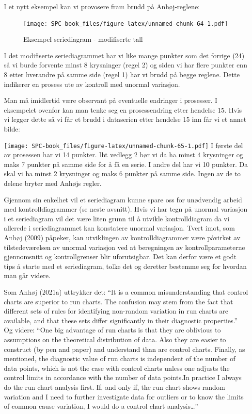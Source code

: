 \documentclass[
]{book}
\begin{document}
I et nytt eksempel kan vi provosere fram brudd på Anhøj-reglene:

\begin{figure}
\centering
\texttt{[image: SPC-book\_files/figure-latex/unnamed-chunk-64-1.pdf]}
\caption{\label{fig:unnamed-chunk-64}Eksempel seriediagram - modifiserte tall}
\end{figure}

I det modifiserte seriediagrammet har vi like mange punkter som det forrige (24) så vi burde forvente minst 8 krysninger (regel 2) og siden vi har flere punkter enn 8 etter hverandre på samme side (regel 1) har vi brudd på begge reglene. Dette indikerer en prosess ute av kontroll med unormal variasjon.

Man må imidlertid være observant på eventuelle endringer i prosesser. I eksempelet ovenfor kan man tenke seg en prosessendring etter hendelse 15. Hvis vi legger dette så vi får et brudd i dataserien etter hendelse 15 inn får vi et annet bilde:

\texttt{[image: SPC-book\_files/figure-latex/unnamed-chunk-65-1.pdf]}
I første del av prosessen har vi 14 punkter. Iht vedlegg 2 bør vi da ha minst 4 krysninger og maks 7 punkter på samme side for å få en serie. I andre del har vi 10 punkter. Da skal vi ha minst 2 krysninger og maks 6 punkter på samme side. Ingen av de to delene bryter med Anhøjs regler.

Gjennom sin enkelhet vil et seriediagram kunne spare oss for unødvendig arbeid med kontrolldiagrammer (se neste avsnitt). Hvis vi har tegn på unormal variasjon i et seriediagram vil det være liten grunn til å utvikle kontrolldiagram da vi allerede i seriediagrammet kan konstatere unormal variasjon. Tvert imot, som Anhøj (2009) påpeker, kan utviklingen av kontrolldiagrammer være påvirket av tilstedeværelsen av unormal variasjon ved at beregningen av kontrollparameterne gjennomsnitt og kontrollgrenser blir uforutsigbar. Det kan derfor være et godt tips å starte med et seriediagram, tolke det og deretter bestemme seg for hvordan man går videre.

Som Anhøj (2021a) uttrykker det: ``It is a common misunderstanding that control charts are superior to run charts. The confusion may stem from the fact that different sets of rules for identifying non-random variation in run charts are available, and that these sets differ significantly in their diagnostic properties.'' Og videre: ``One big advantage of run charts is that they are oblivious to assumptions on the theoretical distribution of data. Also they are easier to construct (by pen and paper) and understand than are control charts. Finally, as mentioned, the diagnostic value of run charts is independent of the number of data points, which is not the case with control charts unless one adjusts the control limits in accordance with the number of data points.In practice I always do the run chart analysis first. If, and only if, the run chart shows random variation and I need to further investigate data for outliers or to know the limits of common cause variation, I would do a control chart analysis\ldots{}''
\end{document}
